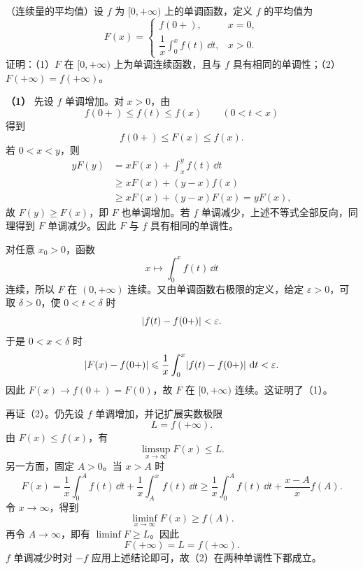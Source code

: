 \begin{xreferenceproblem}[1]
（连续量的平均值）设 $f$ 为 $[0,+\infty)$ 上的单调函数，定义 $f$ 的平均值为
\[
  F(x)=
  \begin{cases}
    f(0+),&x=0,\\[4pt]
    \dfrac1x\displaystyle\int_0^x f(t)\,\dd t,&x>0.
  \end{cases}
\]
证明：（1）$F$ 在 $[0,+\infty)$ 上为单调连续函数，且与 $f$ 具有相同的单调性；（2）$F(+\infty)=f(+\infty)$。
\end{xreferenceproblem}
\begin{xsolution}
\textbf{（1）}\quad
先设 $f$ 单调增加。对 $x>0$，由
\[
  f(0+)\leqslant f(t)\leqslant f(x)\qquad(0<t<x)
\]
得到
\[
  f(0+)\leqslant F(x)\leqslant f(x).
\]
若 $0<x<y$，则
\begin{align*}
  yF(y)
  &=xF(x)+\int_x^y f(t)\,\dd t\\
  &\geqslant xF(x)+(y-x)f(x)\\
  &\geqslant xF(x)+(y-x)F(x)=yF(x),
\end{align*}
故 $F(y)\geqslant F(x)$，即 $F$ 也单调增加。若 $f$ 单调减少，上述不等式全部反向，同理得到 $F$ 单调减少。因此 $F$ 与 $f$ 具有相同的单调性。

对任意 $x_0>0$，函数
\[
  x\longmapsto\int_0^x f(t)\,\dd t
\]
连续，所以 $F$ 在 $(0,+\infty)$ 连续。又由单调函数右极限的定义，给定 $\varepsilon>0$，可取 $\delta>0$，使 $0<t<\delta$ 时
\[
  \lvert f(t)-f(0+)\rvert<\varepsilon.
\]
于是 $0<x<\delta$ 时
\[
  \lvert F(x)-f(0+)\rvert
  \leqslant\frac1x\int_0^x\lvert f(t)-f(0+)\rvert\,\mathop{}\!\mathrm{d} t<\varepsilon.
\]
因此 $F(x)\to f(0+)=F(0)$，故 $F$ 在 $[0,+\infty)$ 连续。这证明了（1）。

再证（2）。仍先设 $f$ 单调增加，并记扩展实数极限
\[
  L=f(+\infty).
\]
由 $F(x)\leqslant f(x)$，有
\[
  \limsup_{x\to\infty}F(x)\leqslant L.
\]
另一方面，固定 $A>0$。当 $x>A$ 时
\[
  F(x)=\frac1x\int_0^A f(t)\,\dd t
  +\frac1x\int_A^x f(t)\,\dd t
  \geqslant\frac1x\int_0^A f(t)\,\dd t
  +\frac{x-A}{x}f(A).
\]
令 $x\to\infty$，得到
\[
  \liminf_{x\to\infty}F(x)\geqslant f(A).
\]
再令 $A\to\infty$，即有 $\liminf F\geqslant L$。因此
\[
  F(+\infty)=L=f(+\infty).
\]
$f$ 单调减少时对 $-f$ 应用上述结论即可，故（2）在两种单调性下都成立。
\end{xsolution}


